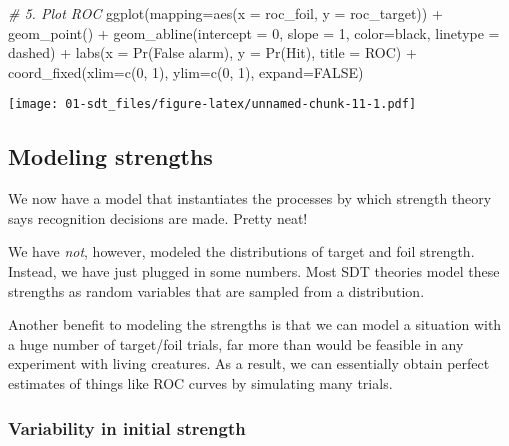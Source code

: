 \documentclass[
]{book}
\newenvironment{Shaded}{\begin{snugshade}}{\end{snugshade}}
\newcommand{\AttributeTok}[1]{\textcolor[rgb]{0.77,0.63,0.00}{#1}}
\newcommand{\CommentTok}[1]{\textcolor[rgb]{0.56,0.35,0.01}{\textit{#1}}}
\newcommand{\ConstantTok}[1]{\textcolor[rgb]{0.00,0.00,0.00}{#1}}
\newcommand{\DecValTok}[1]{\textcolor[rgb]{0.00,0.00,0.81}{#1}}
\newcommand{\FunctionTok}[1]{\textcolor[rgb]{0.00,0.00,0.00}{#1}}
\newcommand{\NormalTok}[1]{#1}
\newcommand{\SpecialCharTok}[1]{\textcolor[rgb]{0.00,0.00,0.00}{#1}}
\newcommand{\StringTok}[1]{\textcolor[rgb]{0.31,0.60,0.02}{#1}}
\begin{document}
\begin{Shaded}
\begin{Highlighting}[]
\CommentTok{\# 5. Plot ROC}
\FunctionTok{ggplot}\NormalTok{(}\AttributeTok{mapping=}\FunctionTok{aes}\NormalTok{(}\AttributeTok{x =}\NormalTok{ roc\_foil, }\AttributeTok{y =}\NormalTok{ roc\_target)) }\SpecialCharTok{+}
    \FunctionTok{geom\_point}\NormalTok{() }\SpecialCharTok{+}
    \FunctionTok{geom\_abline}\NormalTok{(}\AttributeTok{intercept =} \DecValTok{0}\NormalTok{, }\AttributeTok{slope =} \DecValTok{1}\NormalTok{, }\AttributeTok{color=}\StringTok{\textquotesingle{}black\textquotesingle{}}\NormalTok{, }\AttributeTok{linetype =} \StringTok{\textquotesingle{}dashed\textquotesingle{}}\NormalTok{) }\SpecialCharTok{+}
    \FunctionTok{labs}\NormalTok{(}\AttributeTok{x =} \StringTok{\textquotesingle{}Pr(False alarm)\textquotesingle{}}\NormalTok{, }\AttributeTok{y =} \StringTok{\textquotesingle{}Pr(Hit)\textquotesingle{}}\NormalTok{, }\AttributeTok{title =} \StringTok{\textquotesingle{}ROC\textquotesingle{}}\NormalTok{) }\SpecialCharTok{+}
    \FunctionTok{coord\_fixed}\NormalTok{(}\AttributeTok{xlim=}\FunctionTok{c}\NormalTok{(}\DecValTok{0}\NormalTok{, }\DecValTok{1}\NormalTok{), }\AttributeTok{ylim=}\FunctionTok{c}\NormalTok{(}\DecValTok{0}\NormalTok{, }\DecValTok{1}\NormalTok{), }\AttributeTok{expand=}\ConstantTok{FALSE}\NormalTok{)}
\end{Highlighting}
\end{Shaded}

\texttt{[image: 01-sdt\_files/figure-latex/unnamed-chunk-11-1.pdf]}

\hypertarget{modeling-strengths}{%
\subsection{Modeling strengths}\label{modeling-strengths}}

We now have a model that instantiates the processes by which strength theory says recognition decisions are made. Pretty neat!

We have \emph{not}, however, modeled the distributions of target and foil strength. Instead, we have just plugged in some numbers. Most SDT theories model these strengths as random variables that are sampled from a distribution.

Another benefit to modeling the strengths is that we can model a situation with a huge number of target/foil trials, far more than would be feasible in any experiment with living creatures. As a result, we can essentially obtain perfect estimates of things like ROC curves by simulating many trials.

\hypertarget{variability-in-initial-strength}{%
\subsubsection{Variability in initial strength}\label{variability-in-initial-strength}}
\end{document}
